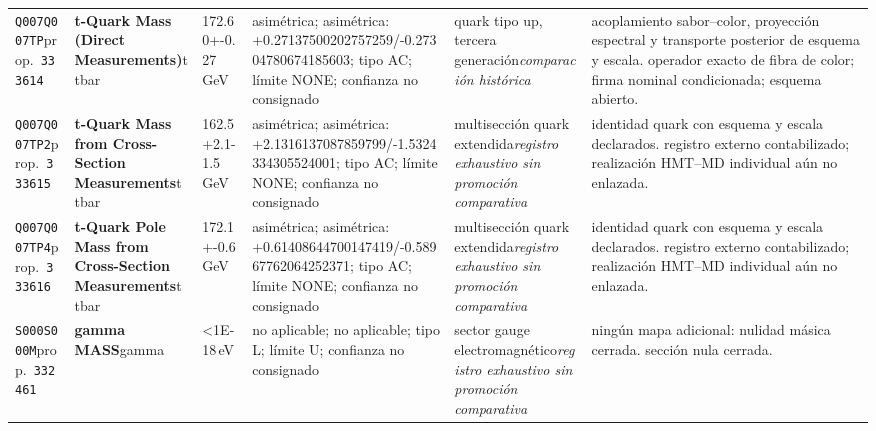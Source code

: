 \begin{landscape}
\begin{longtable}{L{1.85cm}L{4.45cm}L{2.35cm}L{4.05cm}L{3.35cm}L{7.15cm}}
\texttt{Q007}\newline \texttt{Q007TP}\newline prop.\ \texttt{333614} & \textbf{t-Quark Mass (Direct Measurements)}\newline t \textbar{}\allowbreak{} tbar & 172.60+-0.27\,GeV & asimétrica; asimétrica: +0.27137500202757259/-0.27304780674185603; tipo AC; límite NONE; confianza no consignado & quark tipo up, tercera generación\newline \emph{comparación histórica} & acoplamiento sabor--color, proyección espectral y transporte posterior de esquema y escala. operador exacto de fibra de color; firma nominal condicionada; esquema abierto. \\
\texttt{Q007}\newline \texttt{Q007TP2}\newline prop.\ \texttt{333615} & \textbf{t-Quark Mass from Cross-Section Measurements}\newline t \textbar{}\allowbreak{} tbar & 162.5+2.1-1.5\,GeV & asimétrica; asimétrica: +2.1316137087859799/-1.5324334305524001; tipo AC; límite NONE; confianza no consignado & multisección quark extendida\newline \emph{registro exhaustivo sin promoción comparativa} & identidad quark con esquema y escala declarados. registro externo contabilizado; realización HMT--MD individual aún no enlazada. \\
\texttt{Q007}\newline \texttt{Q007TP4}\newline prop.\ \texttt{333616} & \textbf{t-Quark Pole Mass from Cross-Section Measurements}\newline t \textbar{}\allowbreak{} tbar & 172.1+-0.6\,GeV & asimétrica; asimétrica: +0.61408644700147419/-0.58967762064252371; tipo AC; límite NONE; confianza no consignado & multisección quark extendida\newline \emph{registro exhaustivo sin promoción comparativa} & identidad quark con esquema y escala declarados. registro externo contabilizado; realización HMT--MD individual aún no enlazada. \\
\texttt{S000}\newline \texttt{S000M}\newline prop.\ \texttt{332461} & \textbf{gamma MASS}\newline gamma & \textless{}1E-18\,eV & no aplicable; no aplicable; tipo L; límite U; confianza no consignado & sector gauge electromagnético\newline \emph{registro exhaustivo sin promoción comparativa} & ningún mapa adicional: nulidad másica cerrada. sección nula cerrada. \\

\end{longtable}
\end{landscape}
